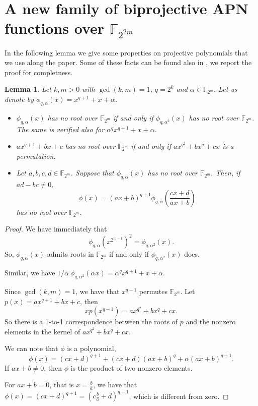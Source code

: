 \documentclass{article}
\newtheorem{lemma}{Lemma}
\begin{document}
\section{A new family of  biprojective APN functions over $\mathbb{F}_{2^{2m}}$}
In the following lemma we give some properties on projective polynomials that we use along the paper. Some of these facts can be found also in \cite{GOLOGLU}, we report the proof for completness.

\begin{lemma}\label{lm:prop}
Let $k,m>0$ with $\gcd(k,m)=1$, $q=2^k$ and $\alpha\in \mathbb{F}_{2^m}$. Let us denote by $\phi_{q,\alpha}(x)=x^{q+1}+x+\alpha$.
\begin{itemize}
    \item[(i)] $\phi_{q,\alpha}(x)$ has no root over $\mathbb{F}_{2^m}$ if and only if $\phi_{q,\alpha^2}(x)$  has no root over $\mathbb{F}_{2^m}$. The same is verified also for $\alpha^q x^{q+1}+x+\alpha$.
    \item[(ii)] $ax^{q+1}+bx+c$ has no root over $\mathbb{F}_{2^m}$ if and only if $ax^{q^2}+bx^q+cx$ is a permutation.
    \item[(iii)] Let $a,b,c,d\in \mathbb{F}_{2^m}$. Suppose that $\phi_{q,\alpha}(x)$ has no root over $\mathbb{F}_{2^m}$. Then, if $ad-bc\ne 0$, 
    $$
    \phi(x)=(ax+b)^{q+1}\phi_{q,\alpha}\left(\frac{cx+d}{ax+b}\right)
    $$
    has no root over $\mathbb{F}_{2^m}$.
\end{itemize}
\end{lemma}
\begin{proof}

We have immediately that 
$$
\phi_{q,\alpha}(x^{2^{m-1}})^2=\phi_{q,\alpha^2}(x).
$$
So, $\phi_{q,\alpha}(x)$ admits roots in $\mathbb{F}_{2^m}$ if and only if $\phi_{q,\alpha^2}(x)$ does.

Similar, we have $1/\alpha\ \phi_{q,\alpha^2}(\alpha x)=\alpha^q x^{q+1}+x+\alpha$.


Since $\gcd(k,m)=1$, we have that $x^{q-1}$ permutes $\mathbb{F}_{2^m}$. Let $p(x)=ax^{q+1}+bx+c$, then
$$
xp(x^{q-1})=ax^{q^2}+bx^q+cx.
$$
So there is a 1-to-1 correspondence between the roots of $p$ and the nonzero elements in the kernel of $ax^{q^2}+bx^q+cx$.

We can note that $\phi$ is a polynomial,
$$
\phi(x)=(cx+d)^{q+1}+(cx+d)(ax+b)^{q}+\alpha(ax+b)^{q+1}.
$$
If $ax+b\ne 0$, then $\phi$ is the product of two nonzero elements. 

For $ax+b= 0$, that is $x=\frac{b}{a}$, we have that $\phi(x)=(cx+d)^{q+1}=\left(c\frac{b}{a}+d\right)^{q+1}$, which is different from zero.
\end{proof}
\end{document}

